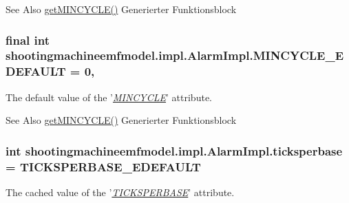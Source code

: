 \begin{DoxySeeAlso}{See Also}
\hyperlink{classshootingmachineemfmodel_1_1impl_1_1_alarm_impl_aac505ee5c09efc58d74135ed3c549009}{get\-M\-I\-N\-C\-Y\-C\-L\-E()} Generierter Funktionsblock  
\end{DoxySeeAlso}
\hypertarget{classshootingmachineemfmodel_1_1impl_1_1_alarm_impl_a292caf682730a300a1517d0a42910743}{
\subsubsection[{M\-I\-N\-C\-Y\-C\-L\-E\-\_\-\-E\-D\-E\-F\-A\-U\-L\-T}]{\setlength{\rightskip}{0pt plus 5cm}final int shootingmachineemfmodel.\-impl.\-Alarm\-Impl.\-M\-I\-N\-C\-Y\-C\-L\-E\-\_\-\-E\-D\-E\-F\-A\-U\-L\-T = 0\hspace{0.3cm}{\ttfamily [static]}, {\ttfamily [protected]}}}\label{classshootingmachineemfmodel_1_1impl_1_1_alarm_impl_a292caf682730a300a1517d0a42910743}
The default value of the '\hyperlink{classshootingmachineemfmodel_1_1impl_1_1_alarm_impl_aac505ee5c09efc58d74135ed3c549009}{{\itshape M\-I\-N\-C\-Y\-C\-L\-E}}' attribute.

\begin{DoxySeeAlso}{See Also}
\hyperlink{classshootingmachineemfmodel_1_1impl_1_1_alarm_impl_aac505ee5c09efc58d74135ed3c549009}{get\-M\-I\-N\-C\-Y\-C\-L\-E()} Generierter Funktionsblock  
\end{DoxySeeAlso}
\hypertarget{classshootingmachineemfmodel_1_1impl_1_1_alarm_impl_ab4ed313bc24457b3837532824d660c94}{
\subsubsection[{ticksperbase}]{\setlength{\rightskip}{0pt plus 5cm}int shootingmachineemfmodel.\-impl.\-Alarm\-Impl.\-ticksperbase = {\bf T\-I\-C\-K\-S\-P\-E\-R\-B\-A\-S\-E\-\_\-\-E\-D\-E\-F\-A\-U\-L\-T}\hspace{0.3cm}{\ttfamily [protected]}}}\label{classshootingmachineemfmodel_1_1impl_1_1_alarm_impl_ab4ed313bc24457b3837532824d660c94}
The cached value of the '\hyperlink{classshootingmachineemfmodel_1_1impl_1_1_alarm_impl_aefdf43cc7e5b3ceae03f889f613e7522}{{\itshape T\-I\-C\-K\-S\-P\-E\-R\-B\-A\-S\-E}}' attribute.

